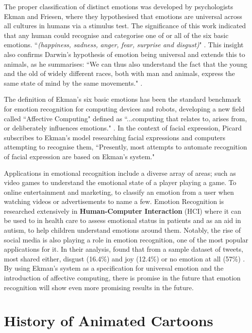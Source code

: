 \documentclass[report, 11pt, oneside]{dissertation}
\begin{document}
 The proper classification of distinct emotions was developed by psychologists Ekman and Friesen, where they hypothesised that emotions are universal across all cultures in humans via a stimulus test. The significance of this work indicated that any human could recognise and categorise one of or all of the six basic emotions. ``\textit{(happiness, sadness, anger, fear, surprise and disgust)}" \citep[124]{ekman1971constants}. This insight also confirms Darwin's hypothesis of emotion being universal and extends this to animals, as he summarises: ``We can thus also understand the fact that the young and the old of widely different races, both with man and animals, express the same state of mind by the same movements." \citep[352]{darwin1872expression}. 
 
 The definition of Ekman's six basic emotions has been the standard benchmark for emotion recognition for computing devices and robots, developing a new field called ``Affective Computing" defined as ``...computing that relates to, arises from, or deliberately influences emotions." \citep{picard1997affective}. In the context of facial expression, Picard subscribes to Ekman's model researching facial expressions and computers attempting to recognise them, ``Presently, most attempts to automate recognition of facial expression are based on Ekman's system." \citep{picard1997affective}

Applications in emotional recognition include a diverse array of areas; such as video games to understand the emotional state of a player playing a game. To online entertainment and marketing, to classify an emotion from a user when watching videos or advertisements to name a few. Emotion Recognition is researched extensively in \textbf{Human-Computer Interaction} (HCI) where it can be used to in health care to assess emotional status in patients \citep{Lisetti2003245} and as an aid in autism, to help children understand emotions around them. Notably, the rise of social media is also playing a role in emotion recognition, one of the most popular applications for it. In their analysis, \citeauthor{Roberts:2012ww} found that from a sample dataset of tweets, most shared either, disgust (16.4\%) and joy (12.4\%) or no emotion at all (57\%) \citeyearpar[3808]{Lisetti2003245}. By using Ekman's system as a specification for universal emotion and the introduction of affective computing, there is promise in the future that emotion recognition will show even more promising results in the future.

\section{History of Animated Cartoons}
\end{document}
